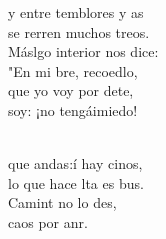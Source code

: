 \documentclass[12pt]{article}
\begin{document}
\begin{multicols*}{2}
\begin{cancion}
	y entre temblores y as \\
	se rerren muchos treos. \\
	Máslgo interior nos dice: \\
	"En mi bre, recoedlo,\\
	que yo voy por dete, \\
	 soy: ¡no tengáimiedo!\\\jump\\
	\begin{chorus}%
	 que andas:í hay cinos,  \\
	lo que hace lta es bus.\\
	Camint no lo des,\\
	 caos por anr.\\
	\end{chorus}%
	\jump\\
\end{cancion}%


\end{multicols*}
\end{document}
